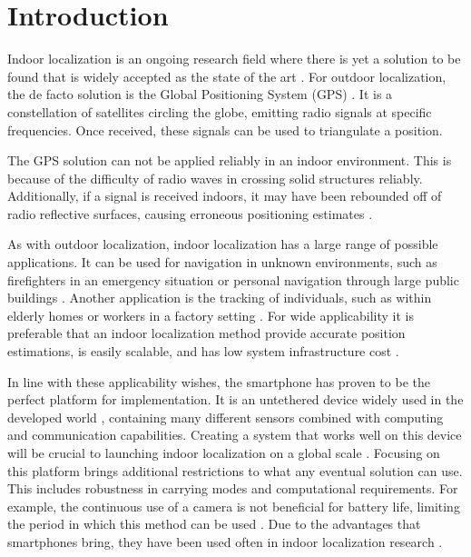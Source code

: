 
\chapter{Introduction} \label{chap:intro}

Indoor localization is an ongoing research field where there is yet a solution to be found that is widely accepted as the state of the art \cite{Davidson2017}. For outdoor localization, the de facto solution is the Global Positioning System (GPS) \cite{Jackermeier2018}. It is a constellation of satellites circling the globe, emitting radio signals at specific frequencies. Once received, these signals can be used to triangulate a position. \par 

The GPS solution can not be applied reliably in an indoor environment. This is because of the difficulty of radio waves in crossing solid structures reliably. Additionally, if a signal is received indoors, it may have been rebounded off of radio reflective surfaces, causing erroneous positioning estimates \cite{Jackermeier2018}. \par 

As with outdoor localization, indoor localization has a large range of possible applications. It can be used for navigation in unknown environments, such as firefighters in an emergency situation or personal navigation through large public buildings \cite{Correa2017, Jackermeier2018}. Another application is the tracking of individuals, such as within elderly homes or workers in a factory setting \cite{Correa2017}. For wide applicability it is preferable that an indoor localization method provide accurate position estimations, is easily scalable, and has low system infrastructure cost \cite{Correa2017}.\par

In line with these applicability wishes, the smartphone has proven to be the perfect platform for implementation.
It is an untethered device widely used in the developed world \cite{Correa2017}, containing many different sensors combined with computing and communication capabilities.
Creating a system that works well on this device will be crucial to launching indoor localization on a global scale \cite{Gu2019}. Focusing on this platform brings additional restrictions to what any eventual solution can use. This includes robustness in carrying modes and computational requirements.  For example, the continuous use of a camera is not beneficial for battery life, limiting the period in which this method can be used \cite{Yang2014, Solin2018a}. Due to the advantages that smartphones bring, they have been used often in indoor localization research \cite{Jackermeier2018,Correa2017,Yang2014, Qian2013}. \par 

